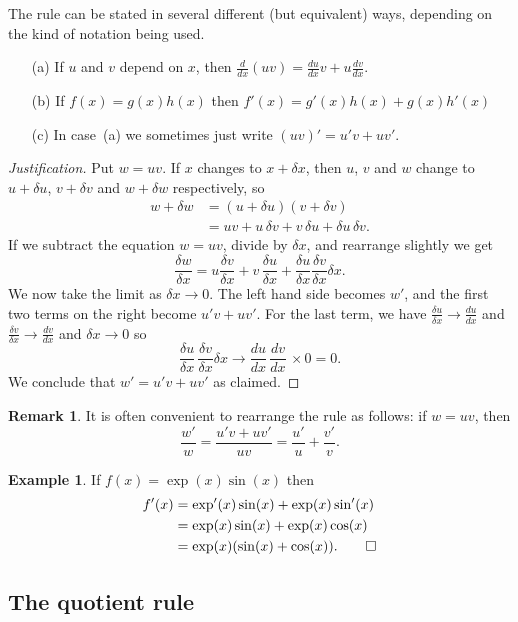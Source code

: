 \documentclass[a4paper]{book}
\newcommand{\tm}        {\times}
\newcommand{\dl}        {\delta}
\newcommand{\xra}       {\xrightarrow}
\renewcommand{\:}{\colon}
\theoremstyle{definition}
\newtheorem{remark}[theorem]{Remark}
\newtheorem{example}[theorem]{Example}
\begin{document}
The rule can be stated in several different (but equivalent) ways,
depending on the kind of notation being used.
\begin{itemize}
 \item[(a)] If $u$ and $v$ depend on $x$, then
  $\frac{d}{dx}(uv)=\frac{du}{dx}v+u\frac{dv}{dx}$.
 \item[(b)] If $f(x)=g(x)h(x)$ then $f'(x)=g'(x)h(x)+g(x)h'(x)$
 \item[(c)] In case~(a) we sometimes just write $(uv)'=u'v+uv'$.  
\end{itemize}
\begin{proof}[Justification]
 Put $w=uv$.  If $x$ changes to $x+\dl x$, then $u$, $v$ and $w$
 change to $u+\dl u$, $v+\dl v$ and $w+\dl w$ respectively, so
 \begin{align*}
  w+\dl w &= (u+\dl u)(v+\dl v) \\
          &= uv + u\,\dl v + v\,\dl u + \dl u\,\dl v.
 \end{align*}
 If we subtract the equation $w=uv$, divide by $\dl x$, and rearrange
 slightly we get
 \[ \frac{\dl w}{\dl x} = 
     u\frac{\dl v}{\dl x} + v\,\frac{\dl u}{\dl x} +
     \frac{\dl u}{\dl x}\frac{\dl v}{\dl x}\dl x.
 \]
 We now take the limit as $\dl x\xra{}0$.  The left hand side becomes
 $w'$, and the first two terms on the right become $u'v+uv'$.   For
 the last term, we have $\frac{\dl u}{\dl x}\xra{}\frac{du}{dx}$ and 
 $\frac{\dl v}{\dl x}\xra{}\frac{dv}{dx}$ and $\dl x\xra{}0$ so 
 \[ \frac{\dl u}{\dl x}\,\frac{\dl v}{\dl x}\dl x \xra{}
     \frac{du}{dx}\,\frac{dv}{dx}\,\tm 0 = 0.
 \]
 We conclude that $w'=u'v+uv'$ as claimed.
\end{proof}
\begin{remark}
 It is often convenient to rearrange the rule as follows: if $w=uv$,
 then 
 \[ \frac{w'}{w} = \frac{u'v+uv'}{uv} =
     \frac{u'}{u} + \frac{v'}{v}.
 \]  
\end{remark}
\begin{example}
 If $f(x)=\exp(x)\sin(x)$ then
 \begin{align*}
  f'(x) &= \exp'(x)\sin(x) + \exp(x)\sin'(x) \\
        &= \exp(x)\sin(x) + \exp(x)\cos(x) \\
        &= \exp(x)(\sin(x)+\cos(x)). \qed
 \end{align*}
\end{example}

\subsection{The quotient rule}
\label{subsec-rule-quot}
\end{document}
